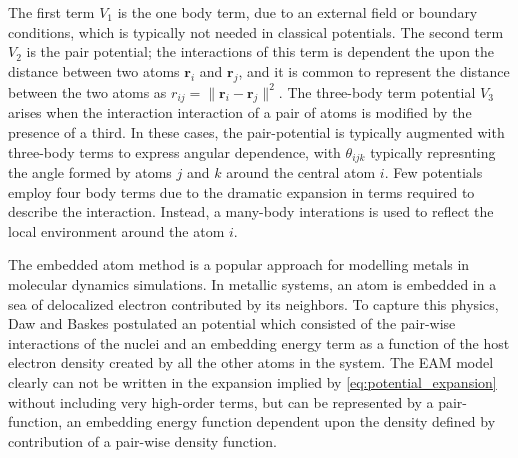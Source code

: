 The first term $V_1$ is the one body term, due to an external field or boundary conditions, which is typically not needed in classical potentials.  The second term $V_2$ is the pair potential; the interactions of this term is dependent the upon the distance between two atoms $\bm{r}_i$ and $\bm{r}_j$, and it is common to represent the distance between the two atoms as $r_{ij}=\lVert \bm{r}_i - \bm{r}_j \rVert^2$.  The three-body term potential $V_3$ arises when the interaction interaction of a pair of atoms is modified by the presence of a third.  In these cases, the pair-potential is typically augmented with three-body terms to express angular dependence, with $\theta_{ijk}$ typically represnting the angle formed by atoms $j$ and $k$ around the central atom $i$\cite{stillinger1985_sw}.    Few potentials employ four body terms due to the dramatic expansion in terms required to describe the interaction.  Instead, a many-body interations is used to reflect the local environment around the atom $i$.

The embedded atom method is a popular approach for modelling metals in molecular dynamics simulations.  In metallic systems, an atom is embedded in a sea of delocalized electron contributed by its neighbors.  To capture this physics, Daw and Baskes postulated an potential which consisted of the pair-wise interactions of the nuclei and an embedding energy term as a function of the host electron density created by all the other atoms in the system.  The EAM model clearly can not be written in the expansion implied by \ref{eq:potential_expansion} without including very high-order terms, but can be represented by a pair-function, an embedding energy function dependent upon the density defined by contribution of a pair-wise density function.

